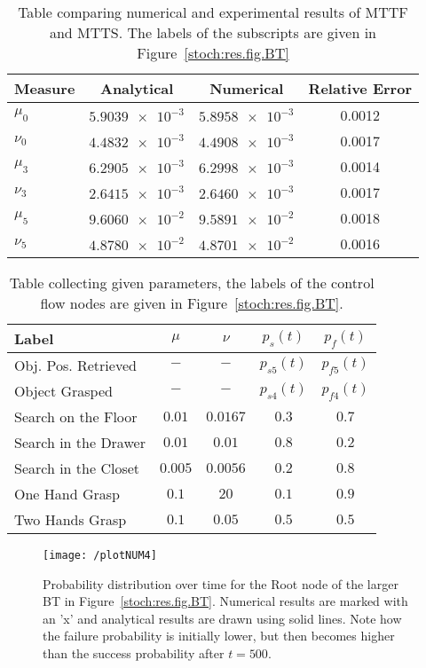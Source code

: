 \begin{table}[h]
\centering
  \begin{tabular}{| l | c | c | c |}\hline
    Measure & Analytical & Numerical & Relative Error \\ \hline \hline 
      $\mu_{0}$ & $\num{5.9039e-3}$ & $\num{5.8958e-3}$ & 0.0012 \\ \hline 
      $\nu_{0}$ & $\num{4.4832e-3}$ & $\num{4.4908e-3}$ & 0.0017 \\ \hline 
      $\mu_3$ &  $\num{6.2905e-3}$ & $\num{6.2998e-3}$  & 0.0014\\ \hline 
      $\nu_3$ & $\num{2.6415e-3}$ & $\num{2.6460e-3}$ & 0.0017 \\ \hline 
      $\mu_5$ & $\num{9.6060e-2}$ & $\num{9.5891e-2}$ &0.0018  \\ \hline 
      $\nu_5$ & $\num{4.8780e-2}$ & $\num{4.8701e-2}$ &0.0016 \\  
               \hline
  \end{tabular}
  \caption{Table comparing numerical and experimental results of MTTF and MTTS. The labels of the subscripts are given in Figure~\ref{stoch:res.fig.BT}}
  \label{stoch:res.tab.times}	
  \end{table}
\begin{table}[h]
\centering
  \begin{tabular}{| l | c | c | c | c |}\hline
    Label & $\mu$ & $\nu$ & $p_s(t)$ & $p_f(t)$\\ \hline \hline
    Obj. Pos. Retrieved & $-$ & $-$ & $p_{s5}(t)$ & $p_{f5}(t)$\\ \hline
    Object Grasped & $-$ & $-$ & $p_{s4}(t)$ & $p_{f4}(t)$\\ \hline
    Search on the Floor & $0.01$ & $0.0167$ & $0.3$ & $0.7$\\ \hline
    Search in the Drawer & $0.01$ & $0.01$ & $0.8$ & $0.2$\\ \hline
    Search in the Closet  & $0.005$ & $0.0056$ & $0.2$ & $0.8$\\ \hline
    One Hand Grasp & $0.1$ & $20$ & $0.1$ & $0.9$\\ \hline
    Two Hands Grasp & $0.1$ & $0.05$ & $0.5$ & $0.5$\\ 
    \hline
  \end{tabular}
  \caption{Table collecting given parameters, the labels of the control flow nodes are given in Figure~\ref{stoch:res.fig.BT}.}
  \label{stoch:res.tab.param}	
  \end{table}

\begin{figure}[!h]
\centering
\texttt{[image: /plotNUM4]}
\caption{Probability distribution over time for the Root node of the larger BT in Figure~\ref{stoch:res.fig.BT}.  Numerical results are marked with an 'x' and analytical results are drawn using solid lines. Note how the failure probability is initially lower, but then becomes higher than the success probability after $t=500$.}
\label{stoch:res.fig.7}
\end{figure}




